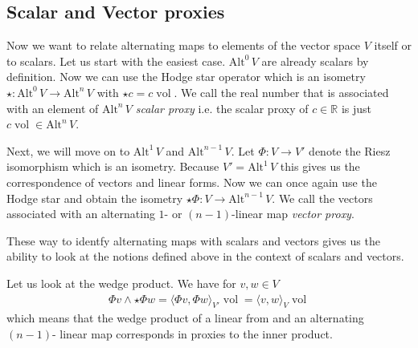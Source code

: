\documentclass[12pt,a4paper]{article}
\numberwithin{equation}{subsection}
\numberwithin{lemma}{subsection}
\theoremstyle{definition}
\DeclareMathOperator{\vol}{vol}
\newcommand{\alternating}[2]{ {\text{Alt}^{#1}\,#2} }
\newcommand{\real}{\mathbb{R}}
\begin{document}
\subsection{Scalar and Vector proxies} \label{sec:scalar_and_vector_proxies}
Now we want to relate alternating maps to elements of the 
vector space $V$ itself or to scalars. Let us start with the easiest 
case. $\alternating{0}{V}$ are already scalars by definition. Now we can use 
the Hodge star operator which is an isometry 
$\star: \alternating{0}{V} \rightarrow \alternating{n}{V}$ with
$\star c = c \vol$. 
We call the real number that is associated with an element of 
$\alternating{n}{V}$ \textit{scalar proxy} i.e. the scalar proxy of 
$c \in \real$ is just $c \vol \in \alternating{n}{V}$.

Next, we will move on to $\alternating{1}{V}$ and $\alternating{n-1}{V}$. 
Let $\Phi: V \rightarrow V'$ denote the Riesz isomorphism which is an isometry.
Because $V' = \alternating{1}{V}$ this gives us the correspondence of 
vectors and linear forms. Now we can once again use the Hodge star and obtain 
the isometry $\star \Phi: V \rightarrow \alternating{n-1}{V}$. We call 
the vectors associated with an alternating $1$- or $(n-1)$-linear map 
\textit{vector proxy}.

These way to identfy alternating maps with scalars and vectors gives us the 
ability to look at the notions defined above in the context of scalars 
and vectors.

Let us look at the wedge product. We have for $v,w \in V$
\begin{align*}
    \Phi v \wedge \star \Phi w = \langle \Phi v , \Phi w \rangle_{V'} \vol
    = \langle v , w \rangle_{V} \vol
\end{align*}
which means that the wedge product of a linear from and an alternating $(n-1)$-
linear map corresponds in proxies to the inner product.
\end{document}
